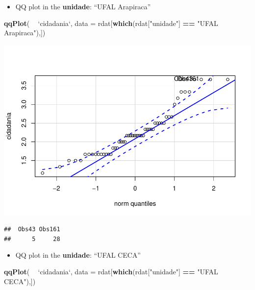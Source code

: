 \documentclass[]{article}
\newenvironment{Shaded}{\begin{snugshade}}{\end{snugshade}}
\newcommand{\DataTypeTok}[1]{\textcolor[rgb]{0.13,0.29,0.53}{#1}}
\newcommand{\KeywordTok}[1]{\textcolor[rgb]{0.13,0.29,0.53}{\textbf{#1}}}
\newcommand{\NormalTok}[1]{#1}
\newcommand{\OperatorTok}[1]{\textcolor[rgb]{0.81,0.36,0.00}{\textbf{#1}}}
\newcommand{\StringTok}[1]{\textcolor[rgb]{0.31,0.60,0.02}{#1}}
\providecommand{\tightlist}{%
  \setlength{\itemsep}{0pt}\setlength{\parskip}{0pt}}
\begin{document}
\begin{itemize}
\tightlist
\item
  QQ plot in the \textbf{unidade}: ``UFAL Arapiraca''
\end{itemize}

\begin{Shaded}
\begin{Highlighting}[]
\KeywordTok{qqPlot}\NormalTok{( }\OperatorTok{~}\StringTok{ `}\DataTypeTok{cidadania}\StringTok{`}\NormalTok{, }\DataTypeTok{data =}\NormalTok{ rdat[}\KeywordTok{which}\NormalTok{(rdat[}\StringTok{"unidade"}\NormalTok{] }\OperatorTok{==}\StringTok{ "UFAL Arapiraca"}\NormalTok{),])}
\end{Highlighting}
\end{Shaded}

\includegraphics{factorialAnova_files/figure-latex/unnamed-chunk-10-1.pdf}

\begin{verbatim}
##  Obs43 Obs161 
##      5     28
\end{verbatim}

\begin{itemize}
\tightlist
\item
  QQ plot in the \textbf{unidade}: ``UFAL CECA''
\end{itemize}

\begin{Shaded}
\begin{Highlighting}[]
\KeywordTok{qqPlot}\NormalTok{( }\OperatorTok{~}\StringTok{ `}\DataTypeTok{cidadania}\StringTok{`}\NormalTok{, }\DataTypeTok{data =}\NormalTok{ rdat[}\KeywordTok{which}\NormalTok{(rdat[}\StringTok{"unidade"}\NormalTok{] }\OperatorTok{==}\StringTok{ "UFAL CECA"}\NormalTok{),])}
\end{Highlighting}
\end{Shaded}
\end{document}
